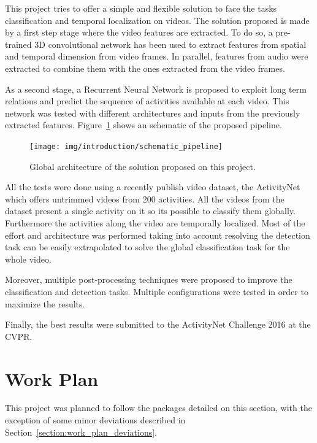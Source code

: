 This project tries to offer a simple and flexible solution to face the tasks classification and temporal localization on videos. The solution proposed is made by a first step stage where the video features are extracted. To do so, a pre-trained 3D convolutional network has been used to extract features from spatial and temporal dimension from video frames. In parallel, features from audio were extracted to combine them with the ones extracted from the video frames.

As a second stage, a Recurrent Neural Network is proposed to exploit long term relations and predict the sequence of activities available at each video. This network was tested with different architectures and inputs from the previously extracted features. Figure~\ref{fig:global_pipeline} shows an schematic of the proposed pipeline.

\begin{figure}[ht]
\begin{center}
\texttt{[image: img/introduction/schematic\_pipeline]}
\end{center}
\caption{Global architecture of the solution proposed on this project.}
\label{fig:global_pipeline}
\end{figure}

All the tests were done using a recently publish video dataset, the ActivityNet~\cite{caba2015activitynet} which offers untrimmed videos from 200 activities. All the videos from the dataset present a single activity on it so its possible to classify them globally. Furthermore the activities along the video are temporally localized. Most of the effort and architecture was performed taking into account resolving the detection task can be easily extrapolated to solve the global classification task for the whole video.

Moreover, multiple post-processing techniques were proposed to improve the classification and detection tasks. Multiple configurations were tested in order to maximize the results.

Finally, the best results were submitted to the ActivityNet Challenge 2016 at the CVPR.

\section{Work Plan}

This project was planned to follow the packages detailed on this section, with the exception of some minor deviations described in Section~\ref{section:work_plan_deviations}.

